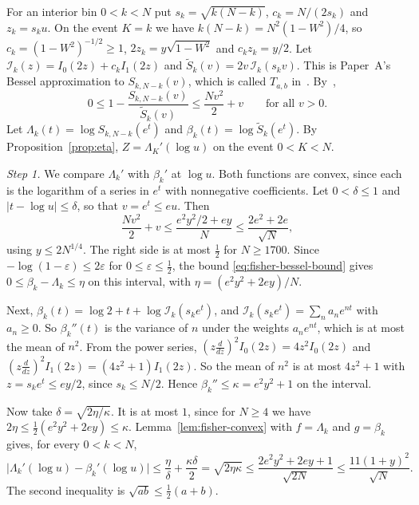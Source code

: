 For an interior bin $0<k<N$ put $s_k=\sqrt{k(N-k)}$, $c_k=N/(2s_k)$ and
$z_k=s_ku$. On the event $K=k$ we have $k(N-k)=N^2(1-W^2)/4$, so
$c_k=(1-W^2)^{-1/2}\ge1$, $2z_k=y\sqrt{1-W^2}$ and $c_kz_k=y/2$. Let
$\mathcal I_k(z)=I_0(2z)+c_kI_1(2z)$ and
$\widetilde S_k(v)=2v\,\mathcal I_k(s_kv)$. This is Paper~A's Bessel
approximation to $S_{k,N-k}(v)$, which is called $T_{a,b}$
in~\cite{paperA}. By~\cite[Thm.~6.2]{paperA},
\begin{equation}\label{eq:fisher-bessel-bound}
 0\le1-\frac{S_{k,N-k}(v)}{\widetilde S_k(v)}\le\frac{Nv^2}2+v
 \qquad\text{for all }v>0 .
\end{equation}
Let $\Lambda_k(t)=\log S_{k,N-k}(e^t)$ and
$\beta_k(t)=\log\widetilde S_k(e^t)$. By Proposition~\ref{prop:eta},
$Z=\Lambda_K'(\log u)$ on the event $0<K<N$.

\emph{Step 1.} We compare $\Lambda_k'$ with $\beta_k'$ at $\log u$. Both
functions are convex, since each is the logarithm of a series in $e^t$ with
nonnegative coefficients. Let $0<\delta\le1$ and $\lvert t-\log u\rvert\le
\delta$, so that $v=e^t\le eu$. Then
\[
 \frac{Nv^2}2+v\le\frac{e^2y^2/2+ey}N\le\frac{2e^2+2e}{\sqrt N},
\]
using $y\le2N^{1/4}$. The right side is at most $\frac12$ for $N\ge1700$.
Since $-\log(1-\varepsilon)\le2\varepsilon$ for
$0\le\varepsilon\le\frac12$, the bound \eqref{eq:fisher-bessel-bound} gives
$0\le\beta_k-\Lambda_k\le\eta$ on this interval, with
$\eta=(e^2y^2+2ey)/N$.

Next, $\beta_k(t)=\log2+t+\log\mathcal I_k(s_ke^t)$, and
$\mathcal I_k(s_ke^t)=\sum_na_ne^{nt}$ with $a_n\ge0$. So $\beta_k''(t)$ is
the variance of $n$ under the weights $a_ne^{nt}$, which is at most the mean
of $n^2$. From the power series,
$(z\frac d{dz})^2I_0(2z)=4z^2I_0(2z)$ and
$(z\frac d{dz})^2I_1(2z)=(4z^2+1)I_1(2z)$. So the mean of $n^2$ is at most
$4z^2+1$ with $z=s_ke^t\le ey/2$, since $s_k\le N/2$. Hence
$\beta_k''\le\kappa=e^2y^2+1$ on the interval.

Now take $\delta=\sqrt{2\eta/\kappa}$. It is at most $1$, since for $N\ge4$
we have $2\eta\le\frac12(e^2y^2+2ey)\le\kappa$. Lemma~\ref{lem:fisher-convex}
with $f=\Lambda_k$ and $g=\beta_k$ gives, for every $0<k<N$,
\begin{equation}\label{eq:fisher-step1}
 \bigl\lvert\Lambda_k'(\log u)-\beta_k'(\log u)\bigr\rvert
 \le\frac\eta\delta+\frac{\kappa\delta}2=\sqrt{2\eta\kappa}
 \le\frac{2e^2y^2+2ey+1}{\sqrt{2N}}\le\frac{11(1+y)^2}{\sqrt N} .
\end{equation}
The second inequality is $\sqrt{ab}\le\frac12(a+b)$.

